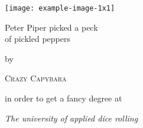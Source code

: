\documentclass{report}
\begin{document}
\begin{titlepage}
	\begin{addmargin}[4cm]{-1cm}
		\centering
		\hfill\texttt{[image: example-image-1x1]}\par
		\vspace{4\baselineskip}
		{\Huge 
		Peter Piper picked a peck\\ of pickled peppers\par}
		\vspace{4\baselineskip}
		by\par\vspace{\baselineskip}
		{\Large\textsc{Crazy Capybara}\par}
		\vfill
		in order to get a fancy degree at\par
		{\itshape The university of applied dice rolling}
	\end{addmargin}
\end{titlepage}
\end{document}
